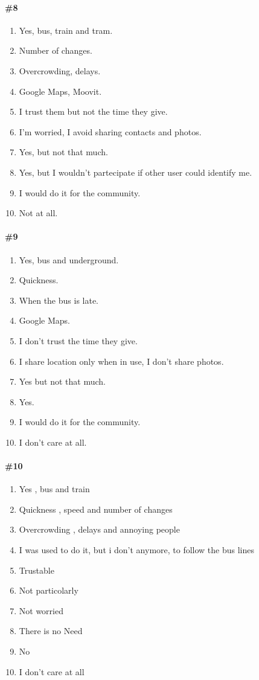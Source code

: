 \documentclass[a4paper, 10pt]{article}
\begin{document}
\paragraph*{\#8}
\begin{enumerate}
    \item Yes, bus, train and tram.
    \item Number of changes.
    \item Overcrowding, delays.
    \item Google Maps, Moovit.
    \item I trust them but not the time they give.
    \item I'm worried, I avoid sharing contacts and photos.
    \item Yes, but not that much.
    \item Yes, but I wouldn't partecipate if other user could identify me.
    \item I would do it for the community.
    \item Not at all.
\end{enumerate}

\paragraph*{\#9}
\begin{enumerate}
    \item Yes, bus and underground.
    \item Quickness.
    \item When the bus is late.
    \item Google Maps.
    \item I don't trust the time they give.
    \item I share location only when in use, I don't share photos.
    \item Yes but not that much.
    \item Yes.
    \item I would do it for the community.
    \item I don't care at all.                   
\end{enumerate}


\paragraph*{\#10}

\begin{enumerate}
    \item  Yes , bus and train
    \item  Quickness , speed and number of changes
    \item  Overcrowding , delays and annoying people
    \item  I was used to do it, but i don't anymore, to follow the bus lines
    \item  Trustable
    \item  Not particolarly
    \item  Not worried 
    \item  There is no Need
    \item  No
    \item  I don't care at all
\end{enumerate}
\end{document}
